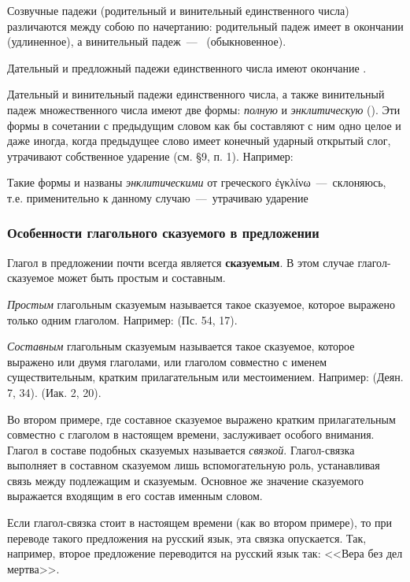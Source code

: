 \documentclass[11pt,a4paper,oneside]{memoir}
\begin{document}
Созвучные падежи (родительный и винительный единственного числа) различаются между собою по начертанию: родительный падеж имеет в окончании {} (удлиненное), а винительный падеж~---~{} (обыкновенное).

Дательный и предложный падежи единственного числа имеют окончание {}.

Дательный и винительный падежи единственного числа, а также винительный падеж множественного числа имеют две формы: \emph{полную} и \emph{энклитическую} ({}). Эти формы в сочетании с предыдущим словом как бы составляют с ним одно целое и даже иногда, когда предыдущее слово имеет конечный ударный открытый слог, утрачивают собственное ударение (см. \S9, п. 1). Например: {}

Такие формы и названы \emph{энклитическими} от греческого \textgreek{ἐγκλίνω}~---~склоняюсь, т.е. применительно к данному случаю~---~утрачиваю ударение

\subsubsection{Особенности глагольного сказуемого в предложении}

Глагол в предложении почти всегда является \textbf{сказуемым}. В этом случае глагол-сказуемое может быть простым и составным.

\emph{Простым} глагольным сказуемым называется такое сказуемое, которое выражено только одним глаголом. Например: {} (Пс. 54, 17).

\emph{Составным} глагольным сказуемым называется такое сказуемое, которое выражено или двумя глаголами, или глаголом совместно с именем существительным, кратким прилагательным или местоимением. Например: {} (Деян. 7, 34). {} (Иак. 2, 20).

Во втором примере, где составное сказуемое выражено кратким прилагательным совместно с глаголом {} в настоящем времени, заслуживает особого внимания. Глагол {} в составе подобных сказуемых называется \emph{связкой}. Глагол-связка выполняет в составном сказуемом лишь вспомогательную роль, устанавливая связь между подлежащим и сказуемым. Основное же значение сказуемого выражается входящим в его состав именным словом.

Если глагол-связка стоит в настоящем времени (как во втором примере), то при переводе такого предложения на русский язык, эта связка опускается. Так, например, второе предложение переводится на русский язык так: <<Вера без дел мертва>>.
\end{document}
